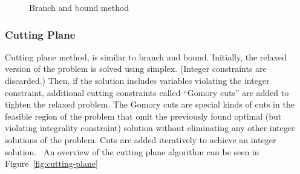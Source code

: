 \documentclass[a4paper,12pt]{report}
\begin{document}
\begin{figure}[ht]
\begin{center}
\end{center}
\caption{Branch and bound method}%
\label{fig:branch-bound}
\end{figure}

\subsubsection{Cutting Plane}

Cutting plane method, is similar to branch and bound. Initially, the relaxed version of the problem is solved using simplex. (Integer constraints are discarded.) Then, if the solution includes variables violating the integer constraint, additional cutting constraints called ``Gomory cuts'' are added to tighten the relaxed problem. The Gomory cuts are special kinds of cuts in the feasible region of the problem that omit the previously found optimal (but violating integrality constraint) solution without eliminating any other integer solutions of the problem. Cuts are added iteratively to achieve an integer solution.~\cite{cutting-plane} An overview of the cutting plane algorithm can be seen in Figure~\ref{fig:cutting-plane}
\end{document}
